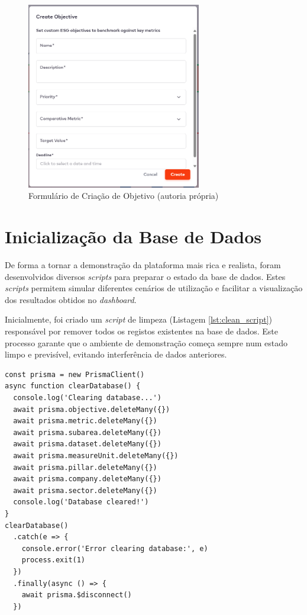 \begin{figure}[H]
    \centering
    \includegraphics[width=3in,keepaspectratio]{frontmatter/assets/platform_prints/objetives/objective_creation.png}
    \caption{Formulário de Criação de Objetivo (autoria própria)}
    \label{fig:objective_creation}
\end{figure}

\section{Inicialização da Base de Dados}

De forma a tornar a demonstração da plataforma mais rica e realista, foram desenvolvidos diversos \textit{scripts} para preparar o estado da base de dados. Estes \textit{scripts} permitem simular diferentes cenários de utilização e facilitar a visualização dos resultados obtidos no \textit{dashboard}.

Inicialmente, foi criado um \textit{script} de limpeza (Listagem \ref{lst:clean_script}) responsável por remover todos os registos existentes na base de dados. Este processo garante que o ambiente de demonstração começa sempre num estado limpo e previsível, evitando interferência de dados anteriores.

\begin{lstlisting}[style=customts, caption={\textit{Script} de limpeza da Base de Dados}, label={lst:clean_script}]
const prisma = new PrismaClient()
async function clearDatabase() {
  console.log('Clearing database...')
  await prisma.objective.deleteMany({})
  await prisma.metric.deleteMany({})
  await prisma.subarea.deleteMany({})
  await prisma.dataset.deleteMany({})
  await prisma.measureUnit.deleteMany({})
  await prisma.pillar.deleteMany({})
  await prisma.company.deleteMany({})
  await prisma.sector.deleteMany({})
  console.log('Database cleared!')
}
clearDatabase()
  .catch(e => {
    console.error('Error clearing database:', e)
    process.exit(1)
  })
  .finally(async () => {
    await prisma.$disconnect()
  })
\end{lstlisting}


